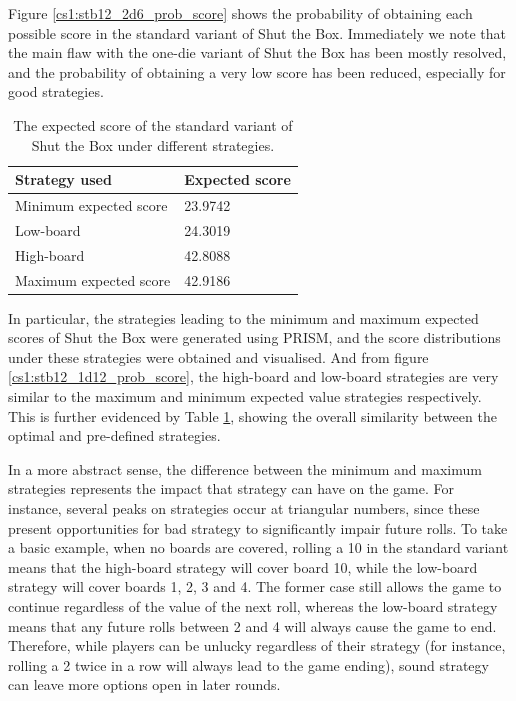 Figure \ref{cs1:stb12_2d6_prob_score} shows the probability of obtaining each possible score in the standard variant of Shut the Box. Immediately we note that the main flaw with the one-die variant of Shut the Box has been mostly resolved, and the probability of obtaining a very low score has been reduced, especially for good strategies.

\begin{table}[h]
    \centering
    \begin{tabular}{@{}ll@{}}
    \toprule
    Strategy used                   & Expected score     \\ \midrule
    \multicolumn{1}{l|}{Minimum expected score}    & 23.9742  \\
    \multicolumn{1}{l|}{Low-board}  & 24.3019 \\
    \multicolumn{1}{l|}{High-board} & 42.8088 \\
    \multicolumn{1}{l|}{Maximum expected score}    & 42.9186
    \end{tabular}
    \caption{The expected score of the standard variant of Shut the Box under different strategies.}
    \label{cs1:exp_value_results}
\end{table}

In particular, the strategies leading to the minimum and maximum expected scores of Shut the Box were generated using PRISM, and the score distributions under these strategies were obtained and visualised. And from figure \ref{cs1:stb12_1d12_prob_score}, the high-board and low-board strategies are very similar to the maximum and minimum expected value strategies respectively. This is further evidenced by Table \ref{cs1:exp_value_results}, showing the overall similarity between the optimal and pre-defined strategies.

In a more abstract sense, the difference between the minimum and maximum strategies represents the impact that strategy can have on the game. For instance, several peaks on strategies occur at triangular numbers, since these present opportunities for bad strategy to significantly impair future rolls. To take a basic example, when no boards are covered, rolling a 10 in the standard variant means that the high-board strategy will cover board 10, while the low-board strategy will cover boards 1, 2, 3 and 4. The former case still allows the game to continue regardless of the value of the next roll, whereas the low-board strategy means that any future rolls between 2 and 4 will always cause the game to end. Therefore, while players can be unlucky regardless of their strategy (for instance, rolling a 2 twice in a row will always lead to the game ending), sound strategy can leave more options open in later rounds.

